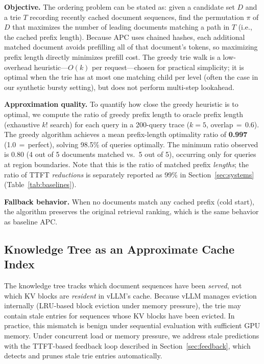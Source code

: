 \documentclass{article}
\begin{document}
\textbf{Objective.} The ordering problem can be stated as: given a candidate set $D$ and a trie $T$ recording recently cached document sequences, find the permutation $\pi$ of $D$ that maximizes the number of leading documents matching a path in $T$ (i.e., the cached prefix length). Because APC uses chained hashes, each additional matched document avoids prefilling all of that document's tokens, so maximizing prefix length directly minimizes prefill cost. The greedy trie walk is a low-overhead heuristic---$O(k)$ per request---chosen for practical simplicity; it is optimal when the trie has at most one matching child per level (often the case in our synthetic bursty setting), but does not perform multi-step lookahead.

\textbf{Approximation quality.} To quantify how close the greedy heuristic is to optimal, we compute the ratio of greedy prefix length to oracle prefix length (exhaustive $k!$ search) for each query in a 200-query trace ($k{=}5$, overlap\,$=$\,0.6). The greedy algorithm achieves a mean prefix-length optimality ratio of \textbf{0.997} (1.0\,$=$\,perfect), solving 98.5\% of queries optimally. The minimum ratio observed is 0.80 (4 out of 5 documents matched vs.\ 5 out of 5), occurring only for queries at region boundaries. Note that this is the ratio of matched prefix \emph{lengths}; the ratio of TTFT \emph{reductions} is separately reported as 99\% in Section~\ref{sec:systems} (Table~\ref{tab:baselines}).

\textbf{Fallback behavior.} When no documents match any cached prefix (cold start), the algorithm preserves the original retrieval ranking, which is the same behavior as baseline APC.

\subsection{Knowledge Tree as an Approximate Cache Index}

The knowledge tree tracks which document sequences have been \emph{served}, not which KV blocks are \emph{resident} in vLLM's cache. Because vLLM manages eviction internally (LRU-based block eviction under memory pressure), the trie may contain stale entries for sequences whose KV blocks have been evicted. In practice, this mismatch is benign under sequential evaluation with sufficient GPU memory. Under concurrent load or memory pressure, we address stale predictions with the TTFT-based feedback loop described in Section~\ref{sec:feedback}, which detects and prunes stale trie entries automatically.
\end{document}
